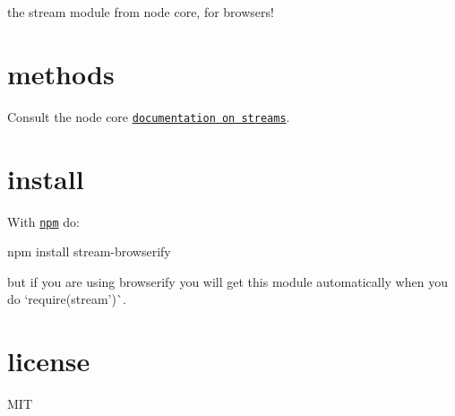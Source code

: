 the stream module from node core, for browsers!

\href{http://travis-ci.org/browserify/stream-browserify}{\tt }

\section*{methods}

Consult the node core \href{http://nodejs.org/docs/latest/api/stream.html}{\tt documentation on streams}.

\section*{install}

With \href{https://npmjs.org}{\tt npm} do\+:


\begin{DoxyCode}
npm install stream-browserify
\end{DoxyCode}


but if you are using browserify you will get this module automatically when you do `require(\textquotesingle{}stream')\`{}.

\section*{license}

M\+IT 
